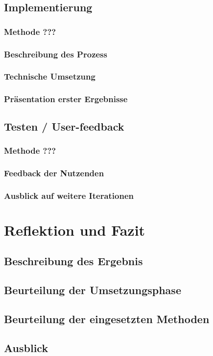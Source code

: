 \documentclass[12pt]{article}
\begin{document}
\subsection{Implementierung}
\subsubsection{Methode ???}
\subsubsection{Beschreibung des Prozess}
\subsubsection{Technische Umsetzung}
\subsubsection{Präsentation erster Ergebnisse}

\subsection{Testen / User-feedback}
\subsubsection{Methode ???}
\subsubsection{Feedback der Nutzenden}
\subsubsection{Ausblick auf weitere Iterationen}

\section{Reflektion und Fazit}
\subsection{Beschreibung des Ergebnis}
\subsection{Beurteilung der Umsetzungsphase}
\subsection{Beurteilung der eingesetzten Methoden}
\subsection{Ausblick}

\newpage



\end{document}
